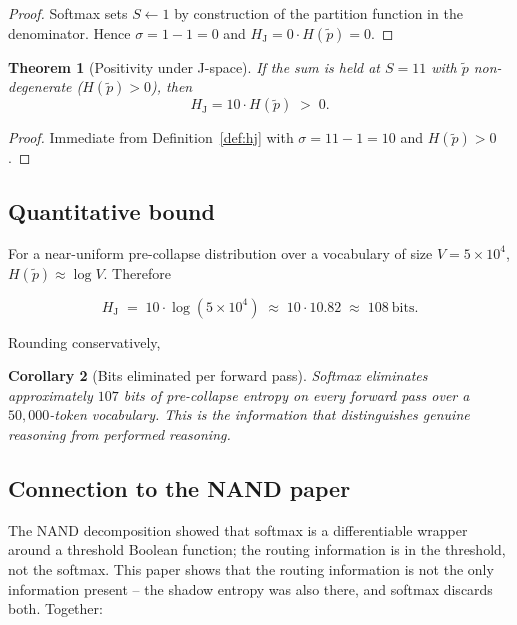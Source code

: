 \documentclass[11pt]{article}
\newtheorem{theorem}{Theorem}[section]
\newtheorem{corollary}[theorem]{Corollary}
\theoremstyle{definition}
\newcommand{\Hj}{H_{\mathrm{J}}}
\newcommand{\shadow}{\sigma}
\newcommand{\pth}{\tilde{p}}
\begin{document}
\begin{proof}
  Softmax sets $S \gets 1$ by construction of the partition function in the
  denominator. Hence $\shadow = 1 - 1 = 0$ and $\Hj = 0 \cdot H(\pth) = 0$.
\end{proof}

\begin{theorem}[Positivity under J-space]
\label{thm:hj-pos}
  If the sum is held at $S = 11$ with $\pth$ non-degenerate
  ($H(\pth) > 0$), then
  \begin{equation}
    \Hj = 10 \cdot H(\pth) \;>\; 0.
  \end{equation}
\end{theorem}

\begin{proof}
  Immediate from Definition~\ref{def:hj} with $\shadow = 11 - 1 = 10$ and
  $H(\pth) > 0$.
\end{proof}

\subsection{Quantitative bound}

For a near-uniform pre-collapse distribution over a vocabulary of size
$V = 5\times 10^4$, $H(\pth) \approx \log V$. Therefore

\begin{equation}
  \Hj \;=\; 10 \cdot \log(5\times 10^4)
  \;\approx\; 10 \cdot 10.82 \;\approx\; 108\ \text{bits}.
\end{equation}

\noindent Rounding conservatively,

\begin{corollary}[Bits eliminated per forward pass]
\label{cor:bits}
  Softmax eliminates approximately $107$ bits of pre-collapse entropy on every
  forward pass over a $50{,}000$-token vocabulary. This is the information that
  distinguishes genuine reasoning from performed reasoning.
\end{corollary}

\subsection{Connection to the NAND paper}

The NAND decomposition \cite{nand2026} showed that softmax is a differentiable
wrapper around a threshold Boolean function; the routing information is in the
threshold, not the softmax. This paper shows that the routing information is
not the only information present -- the shadow entropy was also there, and
softmax discards both. Together:
\end{document}
